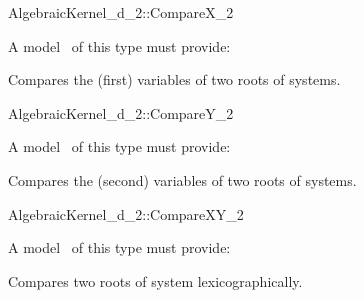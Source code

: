 \begin{ccRefConcept}{AlgebraicKernel_d_2::CompareX_2}


A model \ccVar\ of this type must provide:

{Compares the  (first) variables of two roots of systems.}

\ccSeeAlso

\end{ccRefConcept}
\begin{ccRefConcept}{AlgebraicKernel_d_2::CompareY_2}


A model \ccVar\ of this type must provide:

{Compares the  (second) variables of two roots of systems.}

\ccSeeAlso

\end{ccRefConcept}
\begin{ccRefConcept}{AlgebraicKernel_d_2::CompareXY_2}

\ccDefinition


A model \ccVar\ of this type must provide:

{Compares two roots of system lexicographically.}

\ccSeeAlso

\end{ccRefConcept}
